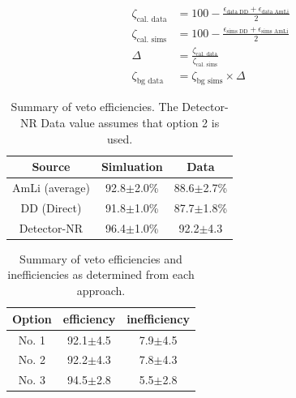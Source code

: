 \begin{align}
	\zeta_{\textrm{cal. data}} & = 100 - \frac{\epsilon_{\textrm{data DD}} +\epsilon_{\textrm{data AmLi}}}{2}  \\
	\zeta_{\textrm{cal. sims}} & = 100 - \frac{\epsilon_{\textrm{sims DD}} + \epsilon_{\textrm{sims AmLi}}}{2} \\
	\Delta                     & = \frac{\zeta_{\textrm{cal. data}}}{\zeta_{\textrm{cal. sims}}}               \\
	\zeta_{\textrm{bg data}}   & = \zeta_{\textrm{bg sims}} \times \Delta
	\label{eq:efficiency_option3}
\end{align}


\clearpage
\begin{table}
	\centering
	\begin{tabular}{|c|c|c|}
    \hline
		Source         & Simluation     & Data           \\ \hline
		AmLi (average) & 92.8$\pm$2.0\% & 88.6$\pm$2.7\% \\
		DD (Direct)    & 91.8$\pm$1.0\% & 87.7$\pm$1.8\% \\
		Detector-NR    & 96.4$\pm$1.0\% & 92.2$\pm$4.3\\
        \hline
	\end{tabular}
	\caption{Summary of veto efficiencies.
		The Detector-NR Data value assumes that option 2 is used.}
	\label{tab:final_veto_efficiency}
\end{table}

\begin{table}
	\centering
	\begin{tabular}{|c|c|c|}
		\hline
        Option & efficiency   & inefficiency \\ 
        \hline
		No. 1  & 92.1$\pm$4.5 & 7.9$\pm$4.5  \\
		No. 2  & 92.2$\pm$4.3 & 7.8$\pm$4.3  \\
		No. 3  & 94.5$\pm$2.8 & 5.5$\pm$2.8 \\
        \hline
	\end{tabular}
	\caption{Summary of veto efficiencies and inefficiencies as determined from each approach.}
	\label{tab:efficiency_options}
\end{table}

